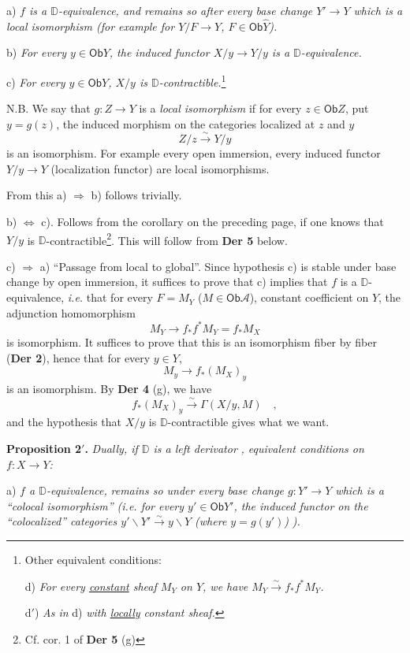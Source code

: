 \documentclass[11pt,leqno]{article}
\newcommand{\msp}[1]{\marginpar{\footnotesize [#1]}}
\newcommand{\DD}{\mathbb{D}}
\newcommand{\cA}{\mathcal{A}}
\newcommand{\Ob}{\mathsf{Ob}}
\newcommand{\isoto}{\overset{\sim}{\to}}
\newcommand{\isolongto}{\overset{\sim}{\longrightarrow}}
\begin{document}
a) \textit{$f$ is a $\DD$-equivalence, and remains so after every base change $Y' \to Y$ which is a local isomorphism (for example for $Y/F \to Y$, $F \in \Ob \widehat{Y}$).}

b) \textit{For every $y \in \Ob Y$, the induced functor $X/y \to Y/y$ is a $\DD$-equivalence.}

c) \textit{For every $y \in \Ob Y$, $X/y$ is $\DD$-contractible.}\footnote[25]{Other equivalent conditions:\par
\indent d) \textit{For every \underline{constant} sheaf $M_Y$ on $Y$, we have $M_Y \isoto f_*f^*M_Y$.}\par
\indent d$'$) \textit{As in} d) \textit{with \underline{locally} constant sheaf.}}

\noindent N.B. We say that $g : Z \to Y$ is a \textit{local isomorphism} if for every $z \in \Ob Z$, put $y = g(z)$, the induced morphism on the categories localized at $z$ and $y$
\[
Z/z \isolongto Y/y
\]
is an isomorphism. For example every open immersion, every induced functor $Y/y \to Y$ (localization functor) are local isomorphisms.

From this a) $\Rightarrow$ b) follows trivially.

b) $\Leftrightarrow$ c). Follows from the corollary on the preceding page, if one knows that $Y/y$ is $\DD$-contractible\footnote[26]{Cf. cor. 1 of \textbf{Der 5} (g)}. This will follow from \textbf{Der 5} below.

\noindent\msp{page 64}

c) $\Rightarrow$ a) ``Passage from local to global''. Since hypothesis c) is stable under base change by open immersion, it suffices to prove that c) implies that $f$ is a $\DD$-equivalence, \textit{i.e.} that for every $F = M_Y$ ($M \in \Ob \cA$), constant coefficient on $Y$, the adjunction homomorphism
\[
M_Y \longrightarrow f_*f^*M_Y = f_*M_X
\]
is isomorphism. It suffices to prove that this is an isomorphism fiber by fiber (\textbf{Der 2}), hence that for every $y \in Y$,
\[
M_y \longrightarrow f_*(M_X)_y
\]
is an isomorphism. By \textbf{Der 4} (g), we have
\[
f_*(M_X)_y \isolongto \Gamma(X/y, M) \quad ,
\]
and the hypothesis that $X/y$ is $\DD$-contractible gives what we want.

\noindent\textbf{Proposition 2$'$.} \textit{Dually, if $\DD$ is a left derivator} \textit{, equivalent conditions on $f : X \to Y$:}

a) \textit{$f$ a $\DD$-equivalence,} \textit{remains so under every base change $g : Y' \to Y$ which is a ``colocal isomorphism'' (i.e. for every $y' \in \Ob Y'$, the induced functor on the ``colocalized'' categories $y'\backslash Y' \isolongto y\backslash Y$ (where $y = g(y')$)} \textit{).}
\end{document}
